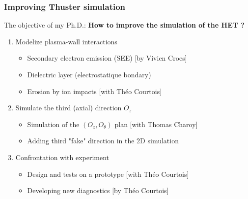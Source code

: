 \documentclass[sans, aspectratio=169]{beamer}
\begin{document}
\begin{frame} 
\frametitle{Improving Thuster simulation} 

The objective of my Ph.D.:\textbf{ How to improve the simulation of the HET ? }
\begin{enumerate}

	\item Modelize plasma-wall interactions
	\begin{itemize}
		\item<2-> Secondary electron emission (SEE) [by Vivien Croes]
		\item<2- | alert@3> Dielectric layer (electrostatique bondary)
		\item<2- | alert@3> Erosion by ion impacts [with Théo Courtois]
	\end{itemize}
	\item Simulate the third (axial) direction $O_z$
	\begin{itemize}
		\item<2- | alert@3> Simulation of the $(O_z, O_{\theta})$ plan [with Thomas Charoy]
		\item<2- | alert@3> Adding third "fake" direction in the 2D simulation
	\end{itemize}
	\item Confrontation with experiment
	\begin{itemize}
		\item<2- | alert@3> Design and tests on a prototype  [with Théo Courtois]
		\item<2- > Developing new diagnostics  [by Théo Courtois]
	\end{itemize}
\end{enumerate}
\end{frame}
\end{document}
